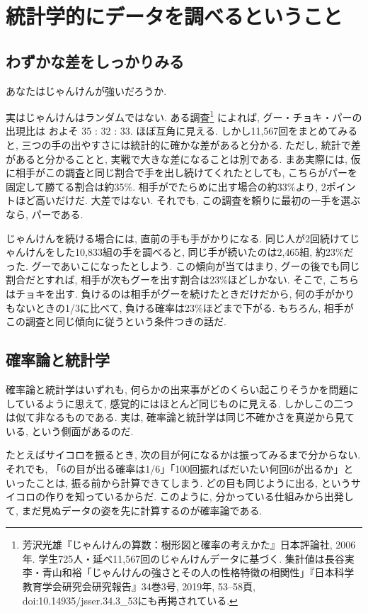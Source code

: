 \section{統計学的にデータを調べるということ}

  \subsection{わずかな差をしっかりみる}

    あなたはじゃんけんが強いだろうか.

    実はじゃんけんはランダムではない.
    ある調査\footnote{%
    芳沢光雄『じゃんけんの算数：樹形図と確率の考えかた』日本評論社, 2006年.
    学生725人・延べ11{,}567回のじゃんけんデータに基づく.
    集計値は長谷実李・青山和裕「じゃんけんの強さとその人の性格特徴の相関性」『日本科学教育学会研究会研究報告』34巻3号, 2019年, 53--58頁, doi:10.14935/jsser.34.3\_53にも再掲されている.}
    によれば, グー・チョキ・パーの出現比は
    およそ 35 : 32 : 33. ほぼ互角に見える.
    しかし11{,}567回をまとめてみると, 三つの手の出やすさには統計的に確かな差があると分かる.
    ただし, 統計で差があると分かることと, 実戦で大きな差になることは別である.
    まあ実際には, 仮に相手がこの調査と同じ割合で手を出し続けてくれたとしても, こちらがパーを固定して勝てる割合は約35\%.
    相手がでたらめに出す場合の約33\%より, 2ポイントほど高いだけだ.
    大差ではない. それでも, この調査を頼りに最初の一手を選ぶなら, パーである.

    じゃんけんを続ける場合には, 直前の手も手がかりになる.
    同じ人が2回続けてじゃんけんをした10{,}833組の手を調べると, 同じ手が続いたのは2{,}465組, 約23\%だった.
    グーであいこになったとしよう.
    この傾向が当てはまり, グーの後でも同じ割合だとすれば, 相手が次もグーを出す割合は23\%ほどしかない.
    そこで, こちらはチョキを出す.
    負けるのは相手がグーを続けたときだけだから, 何の手がかりもないときの1/3に比べて, 負ける確率は23\%ほどまで下がる.
    もちろん, 相手がこの調査と同じ傾向に従うという条件つきの話だ.
  
  \subsection{確率論と統計学}
    確率論と統計学はいずれも, 何らかの出来事がどのくらい起こりそうかを問題にしているように思えて, 感覚的にはほとんど同じものに見える.
    しかしこの二つは似て非なるものである.
    実は, 確率論と統計学は同じ不確かさを真逆から見ている, という側面があるのだ.

    たとえばサイコロを振るとき, 次の目が何になるかは振ってみるまで分からない.
    それでも, 「6の目が出る確率は1/6」「100回振ればだいたい何回6が出るか」といったことは, 振る前から計算できてしまう.
    どの目も同じように出る, というサイコロの作りを知っているからだ.
    このように, 分かっている仕組みから出発して, まだ見ぬデータの姿を先に計算するのが確率論である.

